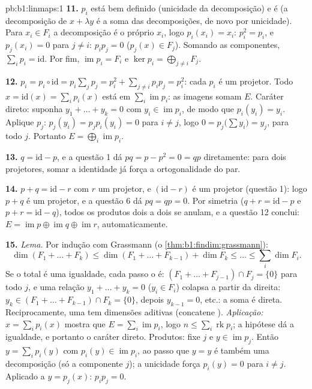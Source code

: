\begin{solution}{pb:b1:linmaps:1}
\textbf{11.} $p_i$ está bem definido (unicidade da decomposição) e
é  (a decomposição de $x + \lambda y$ é a soma das decomposições, de
novo por unicidade). Para $x_i
\in F_i$ a decomposição é o próprio $x_i$,
logo $p_i(x_i) = x_i$: $p_i^2 = p_i$, e $p_j(x_i) = 0$ para $j \neq i$: $p_i p_j = 0$ ($p_j(x) \in F_j$). Somando as
componentes, $\sum_i p_i =
\mathrm{id}$. Por fim, $\operatorname{im} p_i = F_i$ e $\ker
p_i = \bigoplus_{j \neq i} F_j$.

\textbf{12.} $p_i = p_i \circ \mathrm{id} = p_i\sum_j p_j =
p_i^2 + \sum_{j \neq i} p_i p_j = p_i^2$: cada $p_i$ é um projetor. Todo $x = \mathrm{id}(x) = \sum_i p_i(x)$ está em
$\sum_i \operatorname{im} p_i$: as imagens somam $E$. Caráter direto: suponha $y_1 + \dots + y_k = 0$ com
$y_i \in
\operatorname{im} p_i$, de modo que $p_i(y_i) = y_i$. Aplique $p_j$: $p_j
(y_i) = p_j p_i (y_i) = 0$ para $i \neq j$, logo
$0 = p_j\bigl(\sum
y_i\bigr) = y_j$, para todo $j$. Portanto $E = \bigoplus_i
\operatorname{im} p_i$.

\textbf{13.} $q = \mathrm{id} - p$, e a questão 1 dá $pq =
p - p^2 = 0 = qp$ diretamente: para dois
projetores, somar a identidade já força a ortogonalidade do par.

\textbf{14.} $p + q = \mathrm{id} - r$ com $r$ um projetor, e $(\mathrm{id} - r)$ é um projetor
(questão 1): logo $p + q$ é um projetor, e a questão 6 dá $pq = qp = 0$.
Por simetria ($q +
r = \mathrm{id} - p$ e $p + r = \mathrm{id} - q$), todos os produtos dois a dois se
anulam, e a questão 12 conclui: $E =
\operatorname{im} p \oplus \operatorname{im} q \oplus
\operatorname{im} r$, automaticamente.

\textbf{15.} \emph{Lema.} Por indução com Grassmann (o \cref{thm:b1:findim:grassmann}):
\[
\dim(F_1 + \dots + F_k) \leq \dim(F_1 + \dots + F_{k-1}) + \dim
F_k \leq \dots \leq \sum_i \dim F_i .
\]
Se o total é uma igualdade, cada passo o é: $(F_1 + \dots +
F_{j-1}) \cap F_j = \{0\}$ para todo $j$, e
uma relação $y_1 +
\dots + y_k = 0$ ($y_i \in F_i$) colapsa a partir da direita: $y_k
\in (F_1 + \dots + F_{k-1}) \cap F_k = \{0\}$,
depois $y_{k-1} =
0$, etc.: a soma é direta. Reciprocamente, uma  tem dimensões aditivas (concatene ). \emph{Aplicação:}
$x = \sum_i p_i(x)$ mostra que $E = \sum_i \operatorname{im} p_i$, logo $n \leq \sum_i \operatorname{rk} p_i$; a hipótese dá a igualdade, e
portanto o caráter direto. Produtos: fixe $j$ e $y \in
\operatorname{im} p_j$. Então $y = \sum_i p_i(y)$
com $p_i(y)
\in \operatorname{im} p_i$, ao passo que $y = y$ é também uma decomposição (só a
componente $j$); a unicidade força $p_i(y)
= 0$ para $i \neq j$. Aplicado a
$y = p_j(x)$: $p_i p_j = 0$.


\end{solution}
